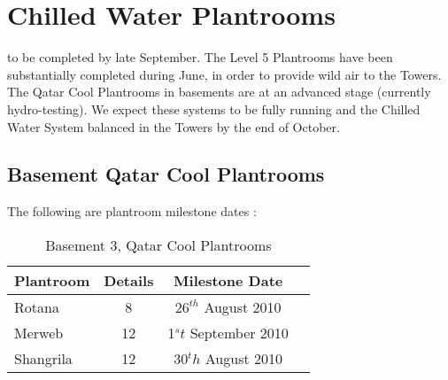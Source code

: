 \chapter{Chilled Water Plantrooms}
\normalsize

  to be completed by late September. The Level 5 Plantrooms have been substantially completed during June,  in order to provide wild air to the Towers. The Qatar Cool Plantrooms in basements  are at an advanced stage (currently hydro-testing).  We expect these systems to be fully running and the Chilled Water System balanced in the Towers by the end of October. 

\section{Basement Qatar Cool Plantrooms}
The following are plantroom milestone dates :
 

  \begin{table}[htbp]
   \begin{center} 
    \begin{tabular}{lccl}
      
      \toprule
      Plantroom   &  Details & Milestone Date  \\
      \midrule
      Rotana       &  8   &  $26^{th}$ August 2010  \\
      Merweb      &  12 &  1$^st$ September 2010  \\
      Shangrila    &  12 &  30$^th$ August 2010  \\
      \bottomrule
    \end{tabular}
    
  \end{center}
  \caption{Basement 3, Qatar Cool Plantrooms}
  \end{table}
 
